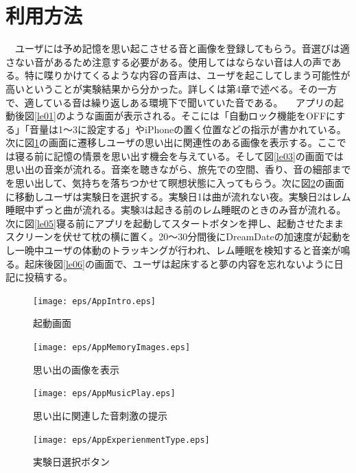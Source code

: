 \section{利用方法}
　ユーザには予め記憶を思い起こさせる音と画像を登録してもらう。音選びは適さない音があるため注意する必要がある。使用してはならない音は人の声である。特に喋りかけてくるような内容の音声は、ユーザを起こしてしまう可能性が高いということが実験結果から分かった。詳しくは第4章で述べる。その一方で、適している音は繰り返しある環境下で聞いていた音である。
　アプリの起動後図\ref{le01}のような画面が表示される。そこには「自動ロック機能をOFFにする」「音量は1〜3に設定する」やiPhoneの置く位置などの指示が書かれている。次に図\ref{le02}の画面に遷移しユーザの思い出に関連性のある画像を表示する。ここでは寝る前に記憶の情景を思い出す機会を与えている。そして図\ref{le03}の画面では思い出の音楽が流れる。音楽を聴きながら、旅先での空間、香り、音の細部までを思い出して、気持ちを落ちつかせて瞑想状態に入ってもらう。次に図\ref{le04}の画面に移動しユーザは実験日を選択する。実験日1は曲が流れない夜。実験日2はレム睡眠中ずっと曲が流れる。実験3は起きる前のレム睡眠のときのみ音が流れる。次に図\ref{le05}寝る前にアプリを起動してスタートボタンを押し、起動させたままスクリーンを伏せて枕の横に置く。20〜30分間後にDreamDateの加速度が起動をし一晩中ユーザの体動のトラッキングが行われ、レム睡眠を検知すると音楽が鳴る。起床後図\ref{le06}の画面で、ユーザは起床すると夢の内容を忘れないように日記に投稿する。

\begin{figure}[htbp]
 \begin{minipage}{0.45\hsize}
  \begin{center}
   \texttt{[image: eps/AppIntro.eps]}
  \end{center}
  \caption{起動画面}
  \label{le01}
 \end{minipage}
  \begin{minipage}{0.45\hsize}
  \begin{center}
   \texttt{[image: eps/AppMemoryImages.eps]}
  \end{center}
  \caption{思い出の画像を表示}
  \label{le02}
 \end{minipage}
\end{figure}
\begin{figure}[htbp]
 \begin{minipage}{0.45\hsize}
  \begin{center}
   \texttt{[image: eps/AppMusicPlay.eps]}
  \end{center}
  \caption{思い出に関連した音刺激の提示}
  \label{le03}
 \end{minipage}
 \begin{minipage}{0.45\hsize}
  \begin{center}
   \texttt{[image: eps/AppExperienmentType.eps]}
  \end{center}
  \caption{実験日選択ボタン}
  \label{le04}
 \end{minipage}
\end{figure}


